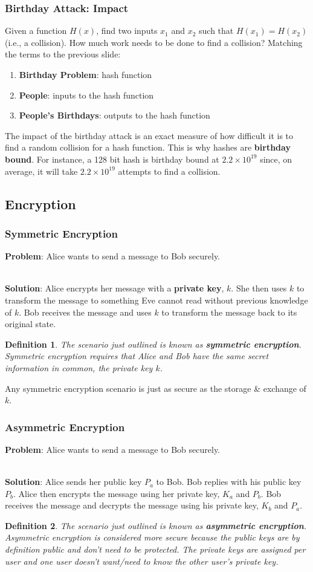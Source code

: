 \documentclass[aspectratio=169]{beamer}
\newtheorem{defn}{Definition}
\begin{document}
\begin{frame}
\frametitle{Birthday Attack: Impact}
Given a function $H(x)$, find two inputs $x_1$ and $x_2$ such that $H(x_1) = H(x_2)$ (i.e., a collision). How much work needs to be done to find a collision? Matching the terms to the previous slide:
\begin{enumerate}
	\item \textbf{Birthday Problem}: hash function
	\item \textbf{People}: inputs to the hash function
	\item \textbf{People's Birthdays}: outputs to the hash function
\end{enumerate}
The impact of the birthday attack is an exact measure of how difficult it is to find a random collision for a hash function. This is why hashes are \textbf{birthday bound}. For instance, a 128 bit hash is birthday bound at $2.2 \times 10^{19}$ since, on average, it will take $2.2 \times 10^{19}$ attempts to find a collision.
\end{frame}

\subsection{Encryption}
\begin{frame}
\frametitle{Symmetric Encryption}
\textbf{Problem}: Alice wants to send a message to Bob securely.

\mbox{}\\
\textbf{Solution}: Alice encrypts her message with a \textbf{private key}, $k$. She then uses $k$ to transform the message to something Eve cannot read without previous knowledge of $k$. Bob receives the message and uses $k$ to transform the message back to its original state.

\begin{defn}
The scenario just outlined is known as \textbf{symmetric encryption}. Symmetric encryption requires that Alice and Bob have the same secret information in common, the private key $k$.
\end{defn}
Any symmetric encryption scenario is just as secure as the storage \& exchange of $k$.
\end{frame}

\begin{frame}
\frametitle{Asymmetric Encryption}
\textbf{Problem}: Alice wants to send a message to Bob securely.

\mbox{}\\
\textbf{Solution}: Alice sends her public key $P_a$ to Bob. Bob replies with his public key $P_b$. Alice then encrypts the message using her private key, $K_a$ and $P_b$. Bob receives the message and decrypts the message using his private key, $K_b$ and $P_a$. 

\begin{defn}
The scenario just outlined is known as \textbf{asymmetric encryption}. Asymmetric encryption is considered more secure because the public keys are by definition public and don't need to be protected. The private keys are assigned per user and one user doesn't want/need to know the other user's private key.
\end{defn}
\end{frame}
\end{document}
